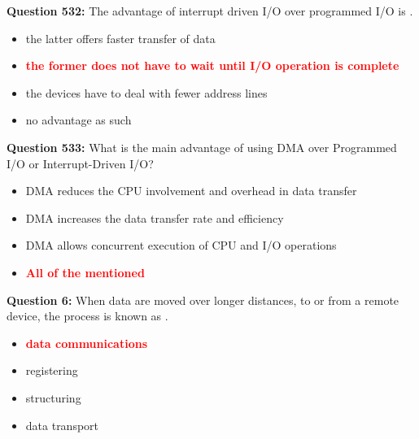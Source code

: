 \documentclass[12pt,a4paper]{article}
\begin{document}
\vspace{0.5cm}

\textbf{Question 532:} The advantage of interrupt driven I/O over programmed I/O is \underline{\hspace{1.5cm}}.

\begin{itemize}
    \item[\textbf{A.}] the latter offers faster transfer of data
    \item[\textbf{B.}] \textcolor{red}{\textbf{the former does not have to wait until I/O operation is complete}}
    \item[\textbf{C.}] the devices have to deal with fewer address lines
    \item[\textbf{D.}] no advantage as such
\end{itemize}

\vspace{0.5cm}

\vspace{0.5cm}

\textbf{Question 533:} What is the main advantage of using DMA over Programmed I/O or Interrupt-Driven I/O?

\begin{itemize}
    \item[\textbf{A.}] DMA reduces the CPU involvement and overhead in data transfer
    \item[\textbf{B.}] DMA increases the data transfer rate and efficiency
    \item[\textbf{C.}] DMA allows concurrent execution of CPU and I/O operations
    \item[\textbf{D.}] \textcolor{red}{\textbf{All of the mentioned}}
\end{itemize}

\vspace{0.5cm}

\vspace{0.5cm}

\textbf{Question 6:} When data are moved over longer distances, to or from a remote device, the process is known as \underline{\hspace{1.5cm}}.

\begin{itemize}
    \item[\textbf{A.}] \textcolor{red}{\textbf{data communications}}
    \item[\textbf{B.}] registering
    \item[\textbf{C.}] structuring
    \item[\textbf{D.}] data transport
\end{itemize}
\end{document}
